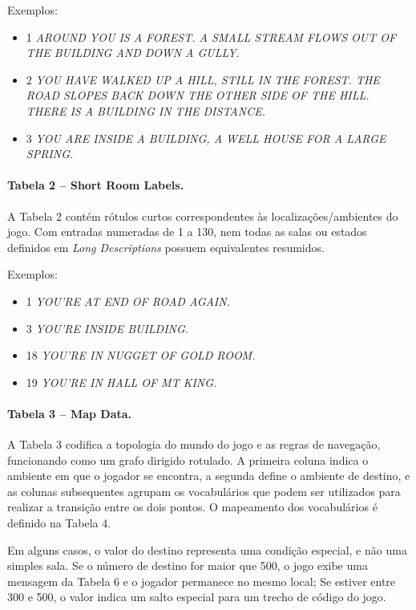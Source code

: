 \documentclass[12pt,a4paper]{article}
\begin{document}
Exemplos:  
\begin{itemize}
    \item 1	\textit{AROUND YOU IS A FOREST.  A SMALL STREAM FLOWS OUT OF THE BUILDING AND DOWN A GULLY}.
    \item 2	\textit{YOU HAVE WALKED UP A HILL, STILL IN THE FOREST.  THE ROAD SLOPES BACK DOWN THE OTHER SIDE OF THE HILL.  THERE IS A BUILDING IN THE DISTANCE.}
    \item 3	\textit{YOU ARE INSIDE A BUILDING, A WELL HOUSE FOR A LARGE SPRING.}
\end{itemize}

\paragraph{Tabela 2 – Short Room Labels.}  
A Tabela 2 contém rótulos curtos correspondentes às localizações/ambientes do jogo. Com entradas numeradas de 1 a 130, nem todas as salas ou estados definidos em \textit{Long Descriptions} possuem equivalentes resumidos.  

Exemplos:  
\begin{itemize}
    \item 1 \textit{YOU'RE AT END OF ROAD AGAIN.}
    \item 3 \textit{YOU'RE INSIDE BUILDING.}
    \item 18 \textit{YOU'RE IN NUGGET OF GOLD ROOM.}
    \item 19 \textit{YOU'RE IN HALL OF MT KING.}
\end{itemize}

\paragraph{Tabela 3 – Map Data.}
A Tabela 3 codifica a topologia do mundo do jogo e as regras de navegação, funcionando como um grafo dirigido rotulado. A primeira coluna indica o ambiente em que o jogador se encontra, a segunda define o ambiente de destino, e as colunas subsequentes agrupam os vocabulários que podem ser utilizados para realizar a transição entre os dois pontos. O mapeamento dos vocabulários é definido na Tabela 4.  

Em alguns casos, o valor do destino representa uma condição especial, e não uma simples sala. Se o número de destino for maior que 500, o jogo exibe uma mensagem da Tabela 6 e o jogador permanece no mesmo local; Se estiver entre 300 e 500, o valor indica um salto especial para um trecho de código do jogo.
   
\end{document}
